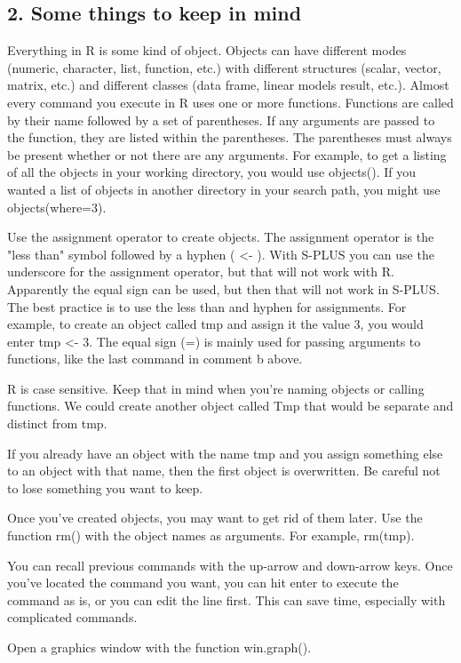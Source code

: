 {\subsection*{2. Some things to keep in mind}


Everything in R is some kind of object. Objects can have different modes (numeric, character, list, function, etc.) with different structures (scalar, vector, matrix, etc.) and different classes (data frame, linear models result, etc.). 
Almost every command you execute in R uses one or more functions. Functions are called by their name followed by a set of parentheses. If any arguments are passed to the function, they are listed within the parentheses. The parentheses must always be present whether or not there are any arguments. For example, to get a listing of all the objects in your working directory, you would use objects(). If you wanted a list of objects in another directory in your search path, you might use objects(where=3). 

Use the assignment operator to create objects. The assignment operator is the "less than" symbol followed by a hyphen ( <- ). With S-PLUS you can use the underscore for the assignment operator, but that will not work with R. Apparently the equal sign can be used, but then that will not work in S-PLUS. The best practice is to use the less than and hyphen for assignments. For example, to create an object called tmp and assign it the value 3, you would enter tmp <- 3. The equal sign (=) is mainly used for passing arguments to functions, like the last command in comment b above. 

R is case sensitive. Keep that in mind when you're naming objects or calling functions. We could create another object called Tmp that would be separate and distinct from tmp. 

If you already have an object with the name tmp and you assign something else to an object with that name, then the first object is overwritten. Be careful not to lose something you want to keep. 

Once you've created objects, you may want to get rid of them later. Use the function rm() with the object names as arguments. For example, rm(tmp). 

You can recall previous commands with the up-arrow and down-arrow keys. Once you've located the command you want, you can hit enter to execute the command as is, or you can edit the line first. This can save time, especially with complicated commands. 

Open a graphics window with the function win.graph(). 

}
